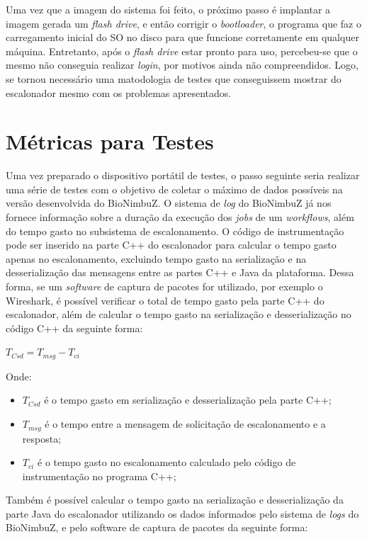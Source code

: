 Uma vez que a imagem do sistema foi feito, o próximo passo é implantar a imagem gerada um \textit{flash drive}, e então corrigir o \textit{bootloader}, o programa que faz o carregamento inicial do \acrshort{SO} no disco para que funcione corretamente em qualquer máquina. Entretanto, após o \textit{flash drive} estar pronto para uso, percebeu-se que o mesmo não conseguia realizar \textit{login}, por motivos ainda não compreendidos. Logo, se tornou necessário uma matodologia de testes que conseguissem mostrar do escalonador mesmo com os problemas apresentados.

\section{Métricas para Testes}

Uma vez preparado o dispositivo portátil de testes, o passo seguinte seria realizar uma série de testes com o objetivo de coletar o máximo de dados possíveis na versão desenvolvida do BioNimbuZ. O sistema de \textit{log} do BioNimbuZ já nos fornece informação sobre a duração da execução dos \textit{jobs} de um \textit{workflows}, além do tempo gasto no subsistema de escalonamento. O código de instrumentação pode ser inserido na parte C++ do escalonador para calcular o tempo gasto apenas no escalonamento, excluindo tempo gasto na serialização e na desserialização das mensagens entre as partes C++ e Java da plataforma. Dessa forma, se um \textit{software} de captura de pacotes for utilizado, por exemplo o Wireshark\cite{Wireshark}, é possível verificar o total de tempo gasto pela parte C++ do escalonador, além de calcular o tempo gasto na serialização e desserialização no código C++ da seguinte forma:

\centerline{ $T_{Csd} = T_{msg} - T_{ci}$ }

Onde: 
 \begin{itemize}
 	\item $T_{Csd}$ é o tempo gasto em serialização e desserialização pela parte C++;
 	\item $T_{msg}$ é o tempo entre a mensagem de solicitação de escalonamento e a resposta;
 	\item $T_{ci}$ é o tempo gasto no escalonamento calculado pelo código de instrumentação no programa C++;
 \end{itemize}

Também é possível calcular o tempo gasto na serialização e desserialização da parte Java do escalonador utilizando os dados informados pelo sistema de \textit{logs} do BioNimbuZ, e pelo software de captura de pacotes da seguinte forma:

